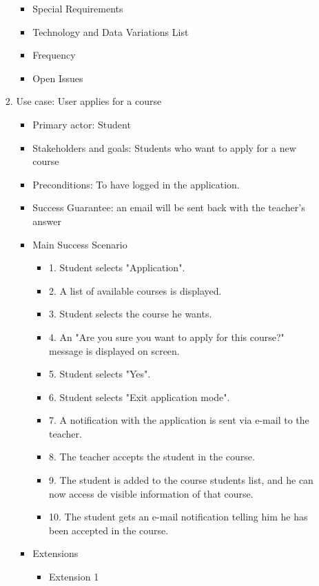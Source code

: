 \documentclass{article}
\begin{document}
\begin{enumerate}
\begin{enumerate}
\begin{enumerate}
\begin{itemize}
				\item Special Requirements
				\item Technology and Data Variations List
				\item Frequency
				\item Open Issues
				
			\end{itemize}
		
		
		
			\item{Use case: User applies for a course}
		
			
			\begin{itemize}
				\item Primary actor: Student
				\item Stakeholders and goals: Students who want to apply for a new course
				\item Preconditions: To have logged in the application.
				\item Success Guarantee: an email will be sent back with the teacher's answer
				\item Main Success Scenario
				\begin{itemize}
					\item 1. Student selects "Application".
					\item 2. A list of available courses is displayed.
					\item 3. Student selects the course he wants.
					\item 4. An "Are you sure you want to apply for this course?" message is displayed on screen.
					\item 5. Student selects "Yes".
					\item 6. Student selects "Exit application mode".
					\item 7. A notification with the application is sent via e-mail to the teacher.
					\item 8. The teacher accepts the student in the course.
					\item 9. The student is added to the course students list, and he can now access de visible information of that course.
					\item 10. The student gets an e-mail notification telling him he has been accepted in the course.
				\end{itemize}
				\item Extensions
				\begin{itemize}
					\item Extension 1
					\begin{itemize}

\end{itemize}
\end{itemize}
\end{itemize}
\end{enumerate}
\end{enumerate}
\end{enumerate}
\end{document}
